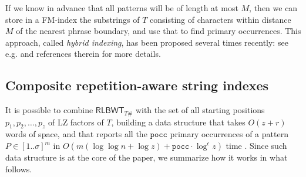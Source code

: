 \documentclass[a4paper,UKenglish]{lipics-v2016}
\newcommand{\RLBWT}{\ensuremath{\mathsf{RLBWT}}}
\begin{document}
If we know in advance that all patterns will be of length at most $M$, then we can store in a FM-index the substrings of $T$ consisting of characters within distance $M$ of the nearest phrase boundary, and use that to find primary occurrences. This approach, called \emph{hybrid indexing}, has been proposed several times recently: see e.g. \cite{valenzuela2016chico} and references therein for more details.














































\subsection{Composite repetition-aware string indexes} \label{sec:compositeStringIndexes}

It is possible to combine $\RLBWT_{T\#}$ with the set of all starting positions $p_1,p_2,\dots,p_z$ of LZ factors of $T$, building a data structure that takes $O(z+r)$ words of space, and that reports all the $\mathtt{pocc}$ primary occurrences of a pattern $P \in [1..\sigma]^m$ in $O(m(\log{\log{n}}+\log{z}) + \mathtt{pocc} \cdot \log^{\epsilon}{z})$ time \cite{belazzougui2015composite}. Since such data structure is at the core of the paper, we summarize how it works in what follows.
\end{document}
